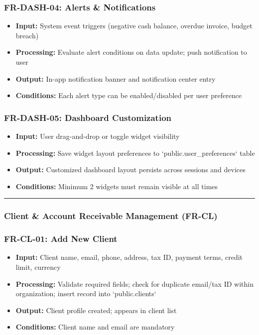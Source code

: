 \documentclass[journal, a4paper, onecolumn, 12pt]{IEEEtran}
\begin{document}
\subsubsection{FR-DASH-04: Alerts \& Notifications}
\begin{itemize}[leftmargin=*]
\item \textbf{Input:} System event triggers (negative cash balance, overdue invoice, budget breach)
\item \textbf{Processing:} Evaluate alert conditions on data update; push notification to user
\item \textbf{Output:} In-app notification banner and notification center entry
\item \textbf{Conditions:} Each alert type can be enabled/disabled per user preference
\end{itemize}

\subsubsection{FR-DASH-05: Dashboard Customization}
\begin{itemize}[leftmargin=*]
\item \textbf{Input:} User drag-and-drop or toggle widget visibility
\item \textbf{Processing:} Save widget layout preferences to `public.user\_preferences` table
\item \textbf{Output:} Customized dashboard layout persists across sessions and devices
\item \textbf{Conditions:} Minimum 2 widgets must remain visible at all times
\end{itemize}

\vspace{1em}\hrule\vspace{1em}

\subsubsection{Client \& Account Receivable Management (FR-CL)}

\subsubsection{FR-CL-01: Add New Client}
\begin{itemize}[leftmargin=*]
\item \textbf{Input:} Client name, email, phone, address, tax ID, payment terms, credit limit, currency
\item \textbf{Processing:} Validate required fields; check for duplicate email/tax ID within organization; insert record into `public.clients`
\item \textbf{Output:} Client profile created; appears in client list
\item \textbf{Conditions:} Client name and email are mandatory
\end{itemize}
\end{document}
